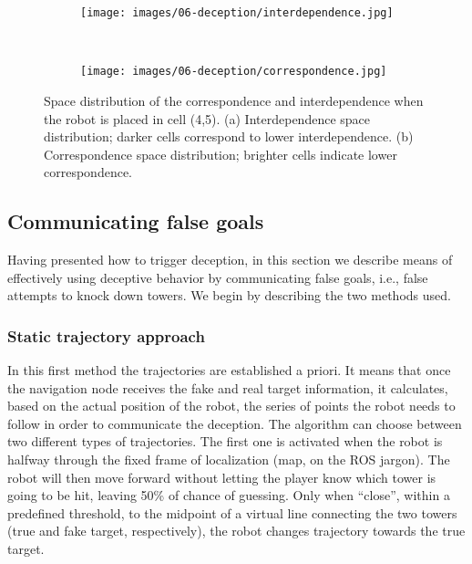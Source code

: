\begin{figure}[H]
    \centering
    \begin{subfigure}[t]{0.49\columnwidth}
        \centering
        \texttt{[image: images/06-deception/interdependence.jpg]}
        \caption{}
        \label{fig:interdipendence}
    \end{subfigure}
    ~
    \begin{subfigure}[t]{0.49\columnwidth}
        \centering
        \texttt{[image: images/06-deception/correspondence.jpg]}
        \caption{}
        \label{fig:correspondence}
    \end{subfigure}
    \caption{Space distribution of the correspondence and interdependence when the robot is placed in cell (4,5). (a) Interdependence space distribution; darker cells correspond to lower interdependence. (b) Correspondence space distribution; brighter cells indicate lower correspondence.}
    \label{fig::interdependece}
\end{figure}

\subsection{Communicating false goals}\label{sec:deception_communicate}
Having presented how to trigger deception, in this section we describe means of effectively using deceptive behavior by communicating false goals, i.e., false attempts to knock down towers. We begin by describing the two methods used.
\subsubsection{Static trajectory approach}
In this first method the trajectories are established a priori. It means that once the navigation node receives the fake and real target information, it calculates, based on the actual position of the robot, the series of points the robot needs to follow in order to communicate the deception.
The algorithm can choose between two different types of trajectories. The first one is activated when the robot is halfway through the fixed frame of localization (map, on the ROS jargon). The robot will then move forward without letting the player know which tower is going to be hit, leaving 50\% of chance of guessing. Only when ``close'', within a predefined threshold, to the midpoint of a virtual line connecting the two towers (true and fake target, respectively), the robot changes trajectory towards the true target.

